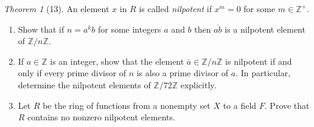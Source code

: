 \documentclass[12pt]{article}
\theoremstyle{remark}
\theoremstyle{named}
\newtheorem*{theorem}{Theorem}
\newcommand{\Z}{\mathbb Z}
\begin{document}
\begin{theorem}[13]
    An element \(x\) in \(R\) is called \textit{nilpotent} if \(x^m = 0\) for some \(m \in \Z^+\).
    \begin{enumerate}
        \item Show that if \(n = a^kb\) for some integers \(a\) and \(b\) then \(\overline{ab}\) is a nilpotent element of \(\Z / n \Z\). 
        \item If \(a \in \Z\) is an integer, show that the element \(\overline{a} \in \Z / n \Z\) is nilpotent if and only if every prime divisor of \(n\) is also a prime divisor of \(a\). 
        In particular, determine the nilpotent elements of \(\Z / 72 \Z\) explicitly.
        \item Let \(R\) be the ring of functions from a nonempty set \(X\) to a field \(F\). Prove that \(R\) contains no nonzero nilpotent elements.
    \end{enumerate}
\end{theorem}
\end{document}
